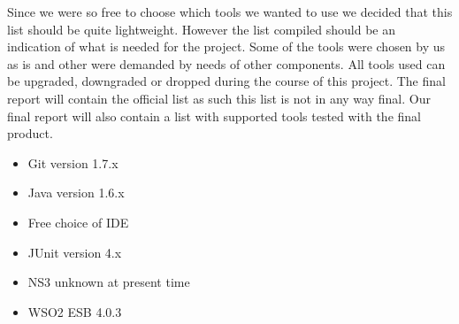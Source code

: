    Since we were so free to choose which tools we wanted to use we decided that this list should be quite lightweight. However the list compiled should be an indication of what is needed for the project. Some of the tools were chosen by us as is and other were demanded by needs of other components. All tools used can be  upgraded, downgraded or dropped during the course of this project. The final report will contain the official list as such this list is not in any way final. Our final report will also contain a list with supported tools tested with the final product.
    \begin{itemize}
        \item Git version 1.7.x
        \item Java version 1.6.x
        \item Free choice of IDE
        \item JUnit version 4.x
        \item NS3 unknown at present time
        \item WSO2 ESB 4.0.3
    \end{itemize}
    

